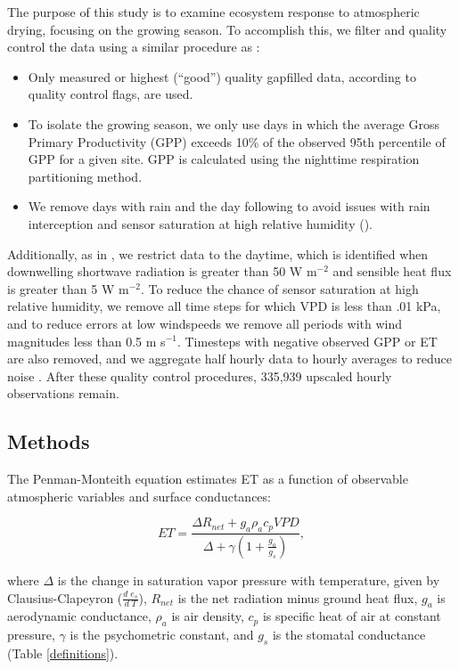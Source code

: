\documentclass[draft,linenumbers]{gcbjournal}
\begin{document}
The purpose of this study is to examine ecosystem response to atmospheric drying, focusing on the growing season. To accomplish this, we filter and quality control the data using a similar procedure as \cite{Zhou_2015}:
\begin{itemize}
\item Only measured or highest (``good'') quality gapfilled data, according to quality control flags, are used.
\item To isolate the growing season, we only use days in which the average Gross Primary Productivity (GPP) exceeds 10\% of the observed 95th percentile of GPP for a given site. GPP is calculated using the nighttime respiration partitioning method.
\item We remove days with rain and the day following to avoid issues with rain interception and sensor saturation at high relative humidity (\cite{MEDLYN_2011}).
\end{itemize}
Additionally, as in \citet{Lin_2018}, we restrict data to the daytime, which is identified when downwelling shortwave radiation is greater than 50 W m$^{-2}$ and sensible heat flux is greater than 5 W m$^{-2}$. To reduce the chance of sensor saturation at high relative humidity, we remove all time steps for which VPD is less than .01 kPa, and to reduce errors at low windspeeds we remove all periods with wind magnitudes less than 0.5 m s$^{-1}$. Timesteps with negative observed GPP or ET are also removed, and we aggregate half hourly data to hourly averages to reduce noise \citep{Lin_2018}. After these quality control procedures, 335,939 upscaled hourly observations remain. 

\subsection{Methods}
\label{methods}
The Penman-Monteith equation \citep [hereafter PM,][]{Penman_1948, Monteith_1965} estimates ET as a function of observable atmospheric variables and surface conductances:
\begin{linenomath*}
  \begin{equation}
    \label{orig_pen}
    ET = \frac{\Delta R_{net} + g_a \rho_a c_p VPD}{\Delta + \gamma(1 + \frac{g_a}{g_s})},
  \end{equation}
\end{linenomath*}
where $\Delta$ is the change in saturation vapor pressure with temperature, given by Clausius-Clapeyron ($\frac{d \; e_s}{d \; T}$), $R_{net}$ is the net radiation minus ground heat flux, $g_a$ is aerodynamic conductance, $\rho_a$ is air density, $c_p$ is specific heat of air at constant pressure, $\gamma$ is the psychometric constant, and $g_s$ is the stomatal conductance (Table \ref{definitions}).
\end{document}
